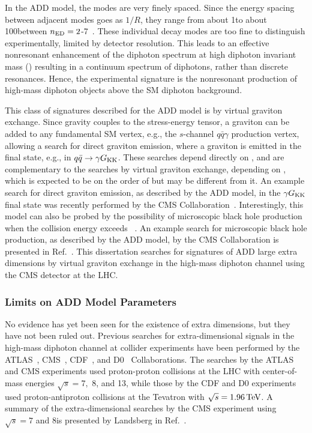 In the ADD model, the \Gkk modes are very finely spaced. Since the energy spacing between adjacent modes goes as $1/R$, they range from about 1\meV to about 100\MeV between $n_{\rm ED}=2$-7~\cite{Han:1998sg}. These individual decay modes are too fine to distinguish experimentally, limited by detector resolution. This leads to an effective nonresonant enhancement of the diphoton spectrum at high diphoton invariant mass (\mgg) resulting in a continuum spectrum of diphotons, rather than discrete resonances. Hence, the experimental signature is the nonresonant production of high-mass diphoton objects above the SM diphoton background.

This class of signatures described for the ADD model is by virtual graviton exchange. Since gravity couples to the stress-energy tensor, a graviton can be added to any fundamental SM vertex, e.g., the $s$-channel $q\bar{q}\gamma$ production vertex, allowing a search for direct graviton emission, where a graviton is emitted in the final state, e.g., in $q\bar{q} \to \gamma G_{\rm KK}$. These searches depend directly on \MD, and are complementary to the searches by virtual graviton exchange, depending on \Ms, which is expected to be on the order of \MD but may be different from it. An example search for direct graviton emission, as described by the ADD model, in the $\gamma G_{\rm KK}$ final state was recently performed by the CMS Collaboration~\cite{Sirunyan:2018dsf}. Interestingly, this model can also be probed by the possibility of microscopic black hole production when the collision energy exceeds \MD~\cite{Banks:1999gd,Dimopoulos:2001hw,Giddings:2001bu}. An example search for microscopic black hole production, as described by the ADD model, by the CMS Collaboration is presented in Ref.~\cite{Sirunyan:2018xwt}. This dissertation searches for signatures of ADD large extra dimensions by virtual graviton exchange in the high-mass diphoton channel using the CMS detector at the LHC.


\subsubsection{Limits on ADD Model Parameters}

No evidence has yet been seen for the existence of extra dimensions, but they have not been ruled out. Previous searches for extra-dimensional signals in the high-mass diphoton channel at collider experiments have been performed by the ATLAS~\cite{ATLAS:2011ab,Aad:2012cy,Aad:2015mna,Aaboud:2016tru,ATLAS-CONF-2016-059,Aaboud:2017yyg}, CMS~\cite{CMS-PAS-EXO-09-004,Chatrchyan:2011jx,Chatrchyan:2011fq,CMS-PAS-EXO-15-004,Khachatryan:2015qba,CMS-PAS-EXO-12-045,Khachatryan:2016yec,Khachatryan:2016hje,Sirunyan:2018wnk}, CDF~\cite{Aaltonen:2011xp}, and D0~\cite{Abazov:2010xh} Collaborations. The searches by the ATLAS and CMS experiments used proton-proton collisions at the LHC with center-of-mass energies $\sqrt{s} = 7,$ 8, and 13\TeV, while those by the CDF and D0 experiments used proton-antiproton collisions at the Tevatron with $\sqrt{s} = 1.96\,\text{Te\hspace{-.08em}V}$. A summary of the extra-dimensional searches by the CMS experiment using $\sqrt{s} = 7$ and 8\TeV is presented by Landsberg in Ref.~\cite{Landsberg:2015pka}.

